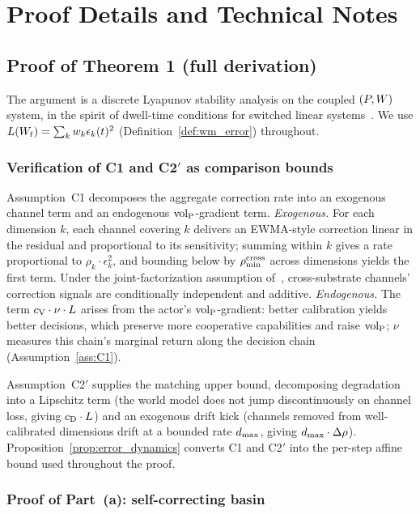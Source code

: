 \section{Proof Details and Technical Notes}
\label{app:proofs}

\subsection{Proof of Theorem 1 (full derivation)}
\label{app:proof_strategy}

The argument is a discrete Lyapunov stability analysis on the coupled
$(P, W)$ system, in the spirit of dwell-time conditions for
switched linear systems~\citep{liberzon2003switching}.  We use
$L(W_t) = \sum_k w_k \epsilon_k(t)^2$
(Definition~\ref{def:wm_error}) throughout.

\subsubsection*{Verification of C1 and C2$'$ as comparison bounds}

Assumption~C1 decomposes the aggregate correction rate into an
exogenous channel term and an endogenous ${\operatorname{vol}_{\mathrm{P}}}$-gradient term.
\emph{Exogenous.}  For each dimension $k$, each channel covering $k$
delivers an EWMA-style correction linear in the residual and
proportional to its sensitivity; summing within $k$ gives a rate
proportional to $\rho_k \cdot \epsilon_k^2$, and bounding below by
$\rho_{\min}^{\mathrm{cross}}$ across dimensions yields the first term.  Under the
joint-factorization assumption of~\citet{lasser2026exo},
cross-substrate channels' correction signals are conditionally
independent and additive.  \emph{Endogenous.}  The term
$c_{\mathrm{V}} \cdot \nu \cdot L$ arises from the actor's
${\operatorname{vol}_{\mathrm{P}}}$-gradient: better calibration yields better decisions, which
preserve more cooperative capabilities and raise ${\operatorname{vol}_{\mathrm{P}}}$; $\nu$
measures this chain's marginal return along the decision chain
(Assumption~\ref{ass:C1}).

Assumption~C2$'$ supplies the matching upper bound, decomposing
degradation into a Lipschitz term (the world model does not jump
discontinuously on channel loss, giving $c_{\mathrm{D}} \cdot L$)
and an exogenous drift kick (channels removed from well-calibrated
dimensions drift at a bounded rate $d_{\mathrm{max}}$, giving
$d_{\mathrm{max}} \cdot \Delta\rho$).  Proposition~\ref{prop:error_dynamics}
converts C1 and C2$'$ into the per-step affine bound used throughout
the proof.

\subsubsection*{Proof of Part~(a): self-correcting basin}

